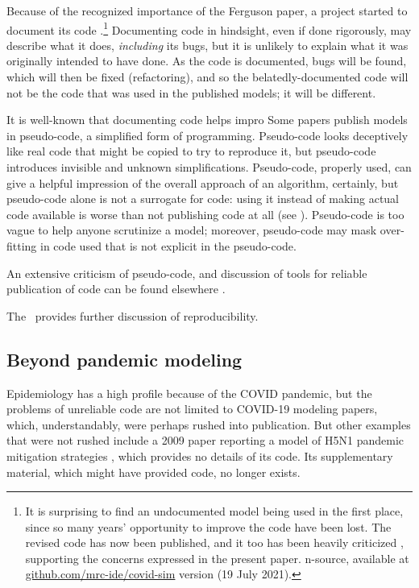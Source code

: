 \documentclass{comjnl}
\begin{document}
Because of the recognized importance of the Ferguson paper, a project started to document its code  \cite{refactoring}.\footnote{It is surprising to find an undocumented model being used in the first place, since so many years' opportunity to improve the code have been lost. The revised code has now been published, and it too has been heavily criticized , supporting the concerns expressed in the present paper.
n-source, available at \url{github.com/mrc-ide/covid-sim} version (19 July 2021).} Documenting code in hindsight, even if done rigorously, may describe what it does, \emph{including\/} its bugs, but it is unlikely to explain what it was originally intended to have done. As the code is documented, bugs will be found, which will then be fixed (refactoring), and so the belatedly-documented code will not be the code that was used in the published models; it will be different. 

It is well-known that documenting code helps impro
Some papers  publish models in pseudo-code, a simplified form of programming. Pseudo-code looks deceptively like real code that might be copied to try to reproduce it, but pseudo-code introduces invisible and unknown simplifications. Pseudo-code, properly used, can give a helpful impression of the overall approach of an algorithm, certainly, but pseudo-code alone is not a surrogate for code: using it instead of making actual code available is worse than not publishing code at all (see \cite{chinese}). Pseudo-code is too vague to help anyone scrutinize a model; moreover, pseudo-code may mask over-fitting in code used that is not explicit in the pseudo-code. 

An extensive criticism of pseudo-code, and discussion of tools for reliable publication of code can be found elsewhere \cite{relit}. 

The \supplement\ provides further discussion of reproducibility.

\subsection{Beyond pandemic modeling}
\label{section-science-beyond-pandemic-modeling}

Epidemiology has a high profile because of the COVID pandemic, but the problems of unreliable code are not limited to COVID-19 modeling papers, which, understandably, were perhaps rushed into publication. But other examples that were not rushed include a 2009 paper reporting a model of H5N1 pandemic mitigation strategies \cite{flu-model}, which provides no details of its code. Its supplementary material, which might have provided code, no longer exists.
\end{document}
